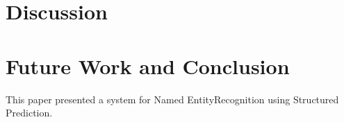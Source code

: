 \documentclass[11pt]{article}
\newcommand{\namedentity}{Named Entity}
\begin{document}
\section{Discussion}


\section{Future Work and Conclusion}

This paper presented a system for \namedentity Recognition using Structured Prediction. 




\end{document}
